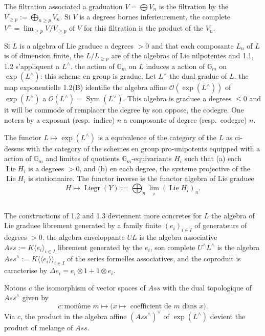 \documentclass[11pt,a4paper]{article}
\theoremstyle{plain}
\theoremstyle{definition}
\DeclareMathOperator{\Lie}{Lie}
\DeclareMathOperator{\Sym}{Sym}
\DeclareMathOperator{\Liegr}{Liegr}
\newcommand{\Ass}{\textit{Ass}}
\newcommand{\Gm}{\mathbb{G}_m}
\begin{document}
The filtration associated a graduation $V = \bigoplus V_n$ is the filtration by the $V_{\geq p} := \bigoplus_{n \geq p} V_n$. Si $V$ is a degrees bornes inferieurement, the complete $V^{\wedge} = \lim_{\geq p} V/V_{\geq p}$ of $V$ for this filtration is the product of the $V_n$.

Si $L$ is a algebra of Lie graduee a degrees $> 0$ and that each composante $L_n$ of $L$ is of dimension finite, the $L/L_{\geq p}$ are of the algebras of Lie nilpotentes and 1.1, 1.2 s'appliquent a $L^{\wedge}$. the action of $\Gm$ on $L$ induces a action of $\Gm$ on $\exp(L^{\wedge})$: this scheme en group is gradue. Let $L^{\vee}$ the dual gradue of $L$. the map exponentielle 1.2(B) identifie the algebra affine $\mathcal{O}(\exp(L^{\wedge}))$ of $\exp(L^{\wedge})$ a $\mathcal{O}(L^{\wedge}) = \Sym(L^{\vee})$. This algebra is graduee a degrees $\leq 0$ and it will be commode of remplacer the degree by son oppose, the codegre. One notera by a exposant (resp.~indice) $n$ a composante of degree (resp.~codegre) $n$.

The functor $L \mapsto \exp(L^{\wedge})$ is a equivalence of the category of the $L$ as ci-dessus with the category of the schemes en group pro-unipotents equipped with a action of $\Gm$ and limites of quotients $\Gm$-equivariants $H_i$ such that (a) each $\Lie H_i$ is a degrees $> 0$, and (b) en each degree, the systeme projective of the $\Lie H_i$ is stationnaire. The functor inverse is the functor algebra of Lie graduee
\[
H \mapsto \Liegr(Y) := \bigoplus_n \lim_i (\Lie H_i)_n.
\]

\subsection{}
The constructions of 1.2 and 1.3 deviennent more concretes for $L$ the algebra of Lie graduee librement generated by a family finite $(e_i)_{i \in I}$ of generateurs of degrees $> 0$. the algebra enveloppante $UL$ is the algebra associative $\Ass := K\langle e_i \rangle_{i \in I}$ librement generated by the $e_i$, son complete $U^{\wedge}L^{\wedge}$ is the algebra $\Ass^{\wedge} := K\langle\langle e_i \rangle\rangle_{i \in I}$ of the series formelles associatives, and the coproduit is caracterise by $\Delta e_i = e_i \otimes 1 + 1 \otimes e_i$.

Notons $c$ the isomorphism of vector spaces of $\Ass$ with the dual topologique of $\Ass^{\wedge}$ given by
\begin{equation}
\label{eq:1.4.1}
c: \text{mon\^ome } m \mapsto \text{($x \mapsto$ coefficient de $m$ dans $x$)}.
\end{equation}
Via $c$, the product in the algebra affine $(\Ass^{\wedge})^{\vee}$ of $\exp(L^{\wedge})$ devient the product of melange of $\Ass$.
\end{document}
